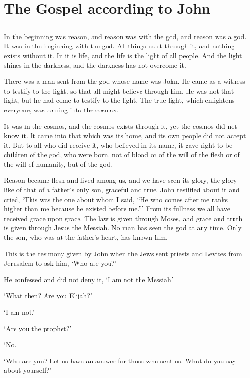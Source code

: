 \chapter{The Gospel according to John}

\section{}

In the beginning was reason,
and reason was with the god,
and reason was a god.
It was in the beginning with the god.
All things exist through it,
and nothing exists without it.
In it is life,
and the life is the light of all people.
And the light shines in the darkness,
and the darkness has not overcome it.

There was a man sent from the god
whose name was John. 
He came as a witness to testify to the light,
so that all might believe through him.
He was not that light,
but he had come to testify to the light.
The true light,
which enlightens everyone,
was coming into the cosmos.

It was in the cosmos,
and the cosmos exists through it,
yet the cosmos did not know it.
It came into that which was its home,
and its own people did not accept it.
But to all who did receive it, 
who believed in its name, 
it gave right to be children of the god,
who were born, not of blood 
or of the will of the flesh
or of the will of humanity,
but of the god.

Reason became flesh and lived among us,
and we have seen its glory,
the glory like of that of a father's only son, 
graceful and true.
John testified about it and cried,
`This was the one about whom I said,
``He who comes after me ranks higher than me
because he existed before me.'''
From its fullness we all have received 
grace upon grace.
The law is given through Moses,
and grace and truth is given through Jesus the Messiah.
No man has seen the god at any time.
Only the son, who was at the father's heart,
has known him.

This is the tesimony given by John 
when the Jews sent priests and Levites from Jerusalem to ask him,
`Who are you?'

He confessed and did not deny it,
`I am not the Messiah.'

`What then? Are you Elijah?'

`I am not.'

`Are you the prophet?'

`No.'

`Who are you?  Let us have an answer for those who sent us. 
What do you say about yourself?'

